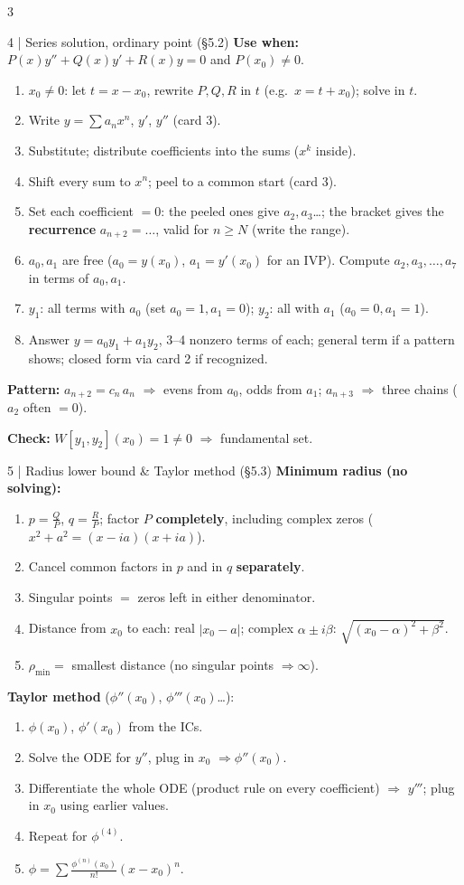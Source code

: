 \documentclass[8pt]{extarticle}
\newcommand{\key}[1]{\textcolor{grn}{\textbf{#1}}}
\newcommand{\when}[1]{\textcolor{amb}{\textbf{Use when:}} #1\par}
\newcommand{\chk}[1]{\par\textcolor{grn}{\textbf{Check:}} #1}
\begin{document}
\begin{multicols*}{3}
\begin{card}{4 \;|\; Series solution, ordinary point (\S5.2)}
\when{$P(x)y''+Q(x)y'+R(x)y=0$ and $P(x_0)\ne0$.}
\begin{enumerate}
\item $x_0\ne0$: let $t=x-x_0$, rewrite $P,Q,R$ in $t$ (e.g.\ $x=t+x_0$); solve in $t$.
\item Write $y=\sum a_nx^n$, $y'$, $y''$ (card 3).
\item Substitute; distribute coefficients into the sums ($x^k$ inside).
\item Shift every sum to $x^n$; peel to a common start (card 3).
\item Set each coefficient $=0$: the peeled ones give $a_2,a_3$\dots; the bracket gives the \key{recurrence} $a_{n+2}=\dots$, valid for $n\ge N$ (write the range).
\item $a_0,a_1$ are free ($a_0=y(x_0)$, $a_1=y'(x_0)$ for an IVP). Compute $a_2,a_3,\dots,a_7$ in terms of $a_0,a_1$.
\item $y_1$: all terms with $a_0$ (set $a_0=1,a_1=0$); $y_2$: all with $a_1$ ($a_0=0,a_1=1$).
\item Answer $y=a_0y_1+a_1y_2$, 3--4 nonzero terms of each; general term if a pattern shows; closed form via card 2 if recognized.
\end{enumerate}
\key{Pattern:} $a_{n+2}=c_n\,a_n$ $\Rightarrow$ evens from $a_0$, odds from $a_1$; $a_{n+3}$ $\Rightarrow$ three chains ($a_2$ often $=0$).
\chk{$W[y_1,y_2](x_0)=1\ne0$ $\Rightarrow$ fundamental set.}
\end{card}

\begin{card}{5 \;|\; Radius lower bound \& Taylor method (\S5.3)}
\key{Minimum radius (no solving):}
\begin{enumerate}
\item $p=\frac QP$, $q=\frac RP$; factor $P$ \textbf{completely}, including complex zeros ($x^2+a^2=(x-ia)(x+ia)$).
\item Cancel common factors in $p$ and in $q$ \textbf{separately}.
\item Singular points $=$ zeros left in either denominator.
\item Distance from $x_0$ to each: real $|x_0-a|$; complex $\alpha\pm i\beta$: $\sqrt{(x_0-\alpha)^2+\beta^2}$.
\item $\rho_{\min}=$ smallest distance (no singular points $\Rightarrow\infty$).
\end{enumerate}
\key{Taylor method} ($\phi''(x_0)$, $\phi'''(x_0)$\dots):
\begin{enumerate}
\item $\phi(x_0)$, $\phi'(x_0)$ from the ICs.
\item Solve the ODE for $y''$, plug in $x_0$ $\Rightarrow\phi''(x_0)$.
\item Differentiate the whole ODE (product rule on every coefficient) $\Rightarrow$ $y'''$; plug in $x_0$ using earlier values.
\item Repeat for $\phi^{(4)}$. \;\item $\phi=\sum\frac{\phi^{(n)}(x_0)}{n!}(x-x_0)^n$.
\end{enumerate}
\end{card}


\end{multicols*}
\end{document}
